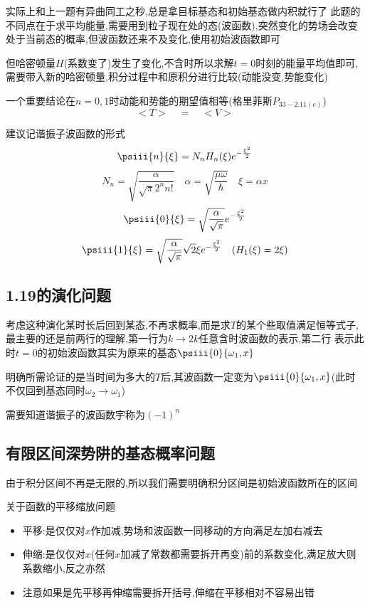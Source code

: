             实际上和上一题有异曲同工之秒,总是拿目标基态和初始基态做内积就行了
            此题的不同点在于求平均能量,需要用到粒子现在处的态(波函数),突然变化的势场会改变处于当前态的概率,但波函数还来不及变化,使用初始波函数即可
            
            但哈密顿量$H$(系数变了)发生了变化,不含时所以求解$t=0$时刻的能量平均值即可,
            需要带入新的哈密顿量,积分过程中和原积分进行比较(动能没变,势能变化)
            
            一个重要结论在$n=0,1$时动能和势能的期望值相等(格里菲斯$P_{33-2.11(c)}$)
            $$ <T> \quad = \quad  <V> $$

            建议记谐振子波函数的形式
            $$ \psiii{n}{\xi} = N_{n} H_{n}(\xi) e^{-\frac{\xi^{2}}{2}} $$
            $$ N_{n} = \sqrt{\frac{\alpha}{\sqrt{\pi}2^{n} n!}}  \quad \alpha = \sqrt{\frac{\mu \omega}{\hbar}} \quad \xi = \alpha x $$
            $$ \psiii{0}{\xi} = \sqrt{\frac{\alpha}{\sqrt{\pi}}} e^{-\frac{\xi^{2}}{2}} $$
            $$ \psiii{1}{\xi} = \sqrt{\frac{\alpha}{\sqrt{\pi}}} \sqrt{2} \xi e^{-\frac{\xi^{2}}{2}} \quad (H_{1}(\xi) = 2\xi) $$
            
        \subsection{1.19的演化问题}
            考虑这种演化某时长后回到某态,不再求概率,而是求$T$的某个些取值满足恒等式子,最主要的还是前两行的理解,第一行为$k \to 2k$任意含时波函数的表示,第二行
            表示此时$t = 0$的初始波函数其实为原来的基态$\psiii{0}{\omega_{1},x}$
            
            明确所需论证的是当时间为多大的$T$后,其波函数一定变为$\psiii{0}{\omega_{1},x}$(此时不仅回到基态同时$\omega_{2} \to \omega_{1}$)

            需要知道谐振子的波函数宇称为$(-1)^{n}$

        \subsection{有限区间深势阱的基态概率问题}
            由于积分区间不再是无限的,所以我们需要明确积分区间是初始波函数所在的区间
            
            关于函数的平移缩放问题
            \begin{itemize}
                \item 平移:是仅仅对$x$作加减,势场和波函数一同移动的方向满足左加右减去
                \item 伸缩:是仅仅对$x$(任何$x$加减了常数都需要拆开再变)前的系数变化,满足放大则系数缩小,反之亦然
                \item 注意如果是先平移再伸缩需要拆开括号,伸缩在平移相对不容易出错
            \end{itemize}

